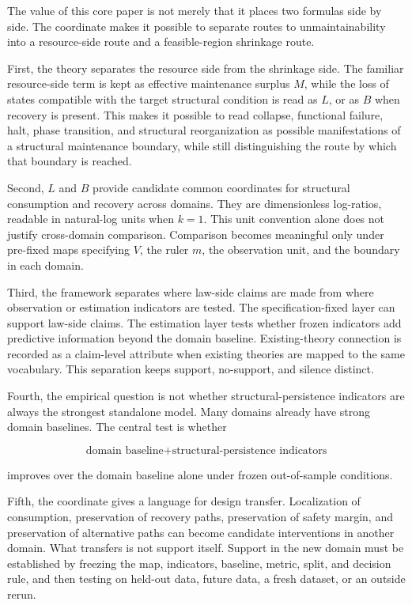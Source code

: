 \documentclass[12pt,a4paper]{article}
\begin{document}
The value of this core paper is not merely that it places two formulas side by side. The coordinate makes it possible to separate routes to unmaintainability into a resource-side route and a feasible-region shrinkage route.

First, the theory separates the resource side from the shrinkage side. The familiar resource-side term is kept as effective maintenance surplus \(M\), while the loss of states compatible with the target structural condition is read as \(L\), or as \(B\) when recovery is present. This makes it possible to read collapse, functional failure, halt, phase transition, and structural reorganization as possible manifestations of a structural maintenance boundary, while still distinguishing the route by which that boundary is reached.

Second, \(L\) and \(B\) provide candidate common coordinates for structural consumption and recovery across domains. They are dimensionless log-ratios, readable in natural-log units when \(k=1\). This unit convention alone does not justify cross-domain comparison. Comparison becomes meaningful only under pre-fixed maps specifying \(V\), the ruler \(m\), the observation unit, and the boundary in each domain.

Third, the framework separates where law-side claims are made from where observation or estimation indicators are tested. The specification-fixed layer can support law-side claims. The estimation layer tests whether frozen indicators add predictive information beyond the domain baseline. Existing-theory connection is recorded as a claim-level attribute when existing theories are mapped to the same vocabulary. This separation keeps support, no-support, and silence distinct.

Fourth, the empirical question is not whether structural-persistence indicators are always the strongest standalone model. Many domains already have strong domain baselines. The central test is whether

\[
\text{domain baseline}+\text{structural-persistence indicators}
\]

improves over the domain baseline alone under frozen out-of-sample conditions.

Fifth, the coordinate gives a language for design transfer. Localization of consumption, preservation of recovery paths, preservation of safety margin, and preservation of alternative paths can become candidate interventions in another domain. What transfers is not support itself. Support in the new domain must be established by freezing the map, indicators, baseline, metric, split, and decision rule, and then testing on held-out data, future data, a fresh dataset, or an outside rerun.
\end{document}
